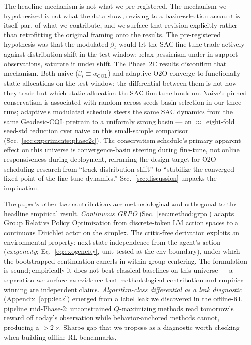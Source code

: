 The headline mechanism is not what we pre-registered. The mechanism
we hypothesized is not what the data show; revising to a
basin-selection account is itself part of what we contribute, and
we surface that revision explicitly rather than retrofitting the
original framing onto the results.
The pre-registered hypothesis was that the modulated $\beta_t$ would
let the SAC fine-tune trade actively against distribution shift in the
test window: relax pessimism under in-support observations, saturate
it under shift. The Phase~2C results disconfirm that mechanism. Both
naive ($\beta_t \equiv \alpha_{\mathrm{CQL}}$) and adaptive O2O
converge to functionally static allocations on the test window; the
differential between them is not how they trade but which static
allocation the SAC fine-tune lands on. Naive's pinned conservatism is
associated with random-across-seeds basin selection in our three
runs; adaptive's modulated schedule steers the same SAC dynamics from
the same Geodesic-CQL pretrain to a uniformly strong basin --- an
$\approx$~eight-fold seed-std reduction over naive on this
small-sample comparison (Sec.~\ref{sec:experiments:phase2c}). The conservatism schedule's primary
apparent effect on this universe is convergence-basin steering during
fine-tune, not online responsiveness during deployment, reframing the
design target for O2O scheduling research from ``track distribution
shift'' to ``stabilize the converged fixed point of the fine-tune
dynamics.'' Sec.~\ref{sec:discussion} unpacks the implication.

The paper's other two contributions are methodological and orthogonal
to the headline empirical result. \emph{Continuous GRPO}
(Sec.~\ref{sec:method:grpo}) adapts Group Relative Policy Optimization
\citep{shao2024deepseekmath} from discrete-token LM action spaces to a
continuous Dirichlet actor on the simplex. The critic-free derivation
exploits an environmental property: next-state independence from the
agent's action (\emph{exogeneity}; Eq.~\ref{eq:exogeneity},
unit-tested at the env boundary), under which the bootstrapped
continuation cancels in within-group centering. The formulation is
sound; empirically it does not beat classical baselines on this
universe --- a separation we surface as evidence that methodological
contribution and empirical winning are independent claims.
\emph{Algorithm-class differential as a leak diagnostic}
(Appendix~\ref{app:leak}) emerged from a label leak we discovered in
the offline-RL pipeline mid-Phase-2: unconstrained $Q$-maximizing
methods read tomorrow's reward off today's observation while
behavior-anchored methods cannot, producing a $> 2\times$ Sharpe gap
that we propose as a diagnostic worth checking when building
offline-RL benchmarks.

